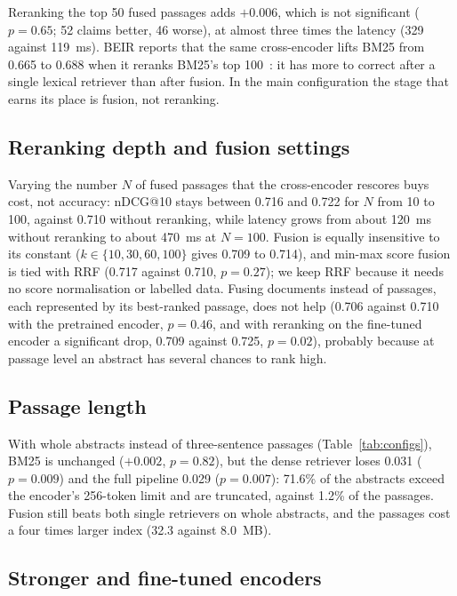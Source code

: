 \documentclass[runningheads]{llncs}
\begin{document}
Reranking the top 50 fused passages adds $+0.006$, which is not significant
($p=0.65$; 52 claims better, 46 worse), at almost three times the latency (329
against 119~ms). BEIR reports that the same cross-encoder lifts BM25 from 0.665 to
0.688 when it reranks BM25's top 100~\cite{thakur2021beir}: it has more to correct
after a single lexical retriever than after fusion. In the main configuration the
stage that earns its place is fusion, not reranking.

\subsection{Reranking depth and fusion settings}

Varying the number $N$ of fused passages that the cross-encoder rescores buys
cost, not accuracy: nDCG@10 stays between 0.716 and 0.722 for $N$ from 10 to 100,
against 0.710 without reranking, while latency grows from about 120~ms without
reranking to about 470~ms at $N=100$. Fusion is equally insensitive to its
constant ($k\in\{10,30,60,100\}$ gives 0.709 to 0.714), and min-max score fusion
is tied with RRF (0.717 against 0.710, $p=0.27$); we keep RRF because it needs no
score normalisation or labelled data. Fusing documents instead of passages, each
represented by its best-ranked passage, does not help (0.706 against 0.710 with
the pretrained encoder, $p=0.46$, and with reranking on the fine-tuned encoder a
significant drop, 0.709 against 0.725, $p=0.02$), probably because at passage
level an abstract has several chances to rank high.

\subsection{Passage length}
With whole abstracts instead of three-sentence passages
(Table~\ref{tab:configs}), BM25 is unchanged ($+0.002$, $p=0.82$), but the dense
retriever loses 0.031 ($p=0.009$) and the full pipeline 0.029 ($p=0.007$): 71.6\%
of the abstracts exceed the encoder's 256-token limit and are truncated, against
1.2\% of the passages. Fusion still beats both single retrievers on whole
abstracts, and the passages cost a four times larger index (32.3 against 8.0~MB).

\subsection{Stronger and fine-tuned encoders}
\end{document}
